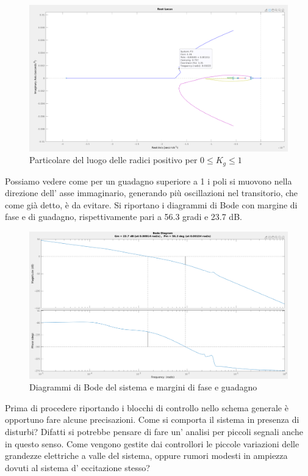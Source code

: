 \documentclass[Lau,noexaminfo]{sapthesis}
\begin{document}
	\begin{figure}
		\centering
			\includegraphics[scale=0.255]{rlocus_F3_particolare}
			\caption{Particolare del luogo delle radici positivo per $0\le K_g \le 1$}
	\end{figure}
	Possiamo vedere come per un guadagno superiore a 1 i poli si muovono nella direzione dell' asse immaginario, generando più oscillazioni nel transitorio, che come già detto, è da evitare. Si riportano i diagrammi di Bode con margine di fase e di guadagno, rispettivamente pari a 56.3 gradi e 23.7 dB.
	\begin{figure}[h]
		\centering
		\includegraphics[scale=0.258]{margin_F3}
		\caption{Diagrammi di Bode del sistema e margini di fase e guadagno}
	\end{figure}
	Prima di procedere riportando i blocchi di controllo nello schema generale è opportuno fare alcune precisazioni. Come si comporta il sistema in presenza di disturbi? Difatti si potrebbe pensare di fare un' analisi per piccoli segnali anche in questo senso. Come vengono gestite dai controllori le piccole variazioni delle grandezze elettriche a valle del sistema, oppure rumori modesti in ampiezza dovuti al sistema d' eccitazione stesso? 
\end{document}
